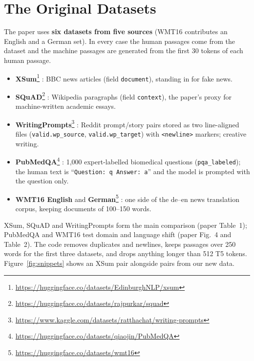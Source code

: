 \documentclass[11pt]{article}
\begin{document}
\section{The Original Datasets}
\label{sec:origdata}
The paper uses \textbf{six datasets from five sources} (WMT16 contributes an English and a German set). In every case the human passages come from the dataset and the machine passages are generated from the first 30 tokens of each human passage.
\begin{itemize}\itemsep0pt
\item \textbf{XSum}\footnote{\url{https://huggingface.co/datasets/EdinburghNLP/xsum}} \citep{narayan2018xsum}: BBC news articles (field \texttt{document}), standing in for fake news.
\item \textbf{SQuAD}\footnote{\url{https://huggingface.co/datasets/rajpurkar/squad}} \citep{rajpurkar2016squad}: Wikipedia paragraphs (field \texttt{context}), the paper's proxy for machine-written academic essays.
\item \textbf{WritingPrompts}\footnote{\url{https://www.kaggle.com/datasets/ratthachat/writing-prompts}} \citep{fan2018hierarchical}: Reddit prompt/story pairs stored as two line-aligned files (\texttt{valid.wp\_source}, \texttt{valid.wp\_target}) with \texttt{<newline>} markers; creative writing.
\item \textbf{PubMedQA}\footnote{\url{https://huggingface.co/datasets/qiaojin/PubMedQA}} \citep{jin2019pubmedqa}: 1{,}000 expert-labelled biomedical questions (\texttt{pqa\_labeled}); the human text is ``\texttt{Question: q Answer: a}'' and the model is prompted with the question only.
\item \textbf{WMT16 English} and \textbf{German}\footnote{\url{https://huggingface.co/datasets/wmt16}} \citep{bojar2016wmt}: one side of the de--en news translation corpus, keeping documents of 100--150 words.
\end{itemize}
XSum, SQuAD and WritingPrompts form the main comparison (paper Table~1); PubMedQA and WMT16 test domain and language shift (paper Fig.~4 and Table~2). The code removes duplicates and newlines, keeps passages over 250 words for the first three datasets, and drops anything longer than 512 T5 tokens. Figure~\ref{fig:snippets} shows an XSum pair alongside pairs from our new data.
\end{document}
